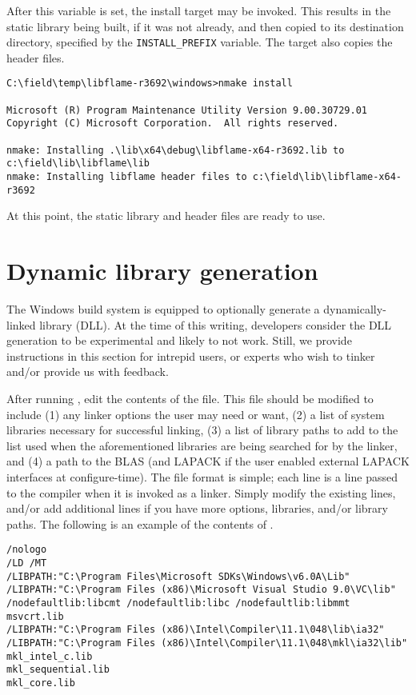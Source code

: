\noindent
After this variable is set, the \nmake install target may be invoked.
This results in the static library being built, if it was not already, and
then copied to its destination directory, specified by the
{\tt INSTALL\_PREFIX} \nmake variable.
The \install target also copies the \libflame header files.

\begin{Verbatim}[frame=single,framesep=2.5mm,xleftmargin=5mm,fontsize=\footnotesize]
C:\field\temp\libflame-r3692\windows>nmake install

Microsoft (R) Program Maintenance Utility Version 9.00.30729.01
Copyright (C) Microsoft Corporation.  All rights reserved.

nmake: Installing .\lib\x64\debug\libflame-x64-r3692.lib to c:\field\lib\libflame\lib
nmake: Installing libflame header files to c:\field\lib\libflame-x64-r3692
\end{Verbatim}

At this point, the static library and header files are ready to use.



\section{Dynamic library generation}
\label{sec:dll}

The Windows build system is equipped to optionally generate a
dynamically-linked library (DLL).
At the time of this writing, \libflame developers consider the DLL generation
to be experimental and likely to not work.
Still, we provide instructions in this section for intrepid users,
or experts who wish to tinker and/or provide us with feedback.

After running \configurecmdns, edit the contents of the \linkargs file.
This file should be modified to include (1) any linker options the user
may need or want, (2) a list of system libraries necessary for
successful linking, (3) a list of library paths to add to the list
used when the aforementioned libraries are being searched for by the linker,
and (4) a path to the BLAS (and LAPACK if the user enabled external
LAPACK interfaces at configure-time).
The file format is simple; each line is a line passed to the compiler when
it is invoked as a linker.
Simply modify the existing lines, and/or add additional lines if you have
more options, libraries, and/or library paths.
The following is an example of the contents of \linkargsns.

\begin{Verbatim}[frame=single,framesep=2.5mm,xleftmargin=5mm,fontsize=\footnotesize]
/nologo
/LD /MT
/LIBPATH:"C:\Program Files\Microsoft SDKs\Windows\v6.0A\Lib"
/LIBPATH:"C:\Program Files (x86)\Microsoft Visual Studio 9.0\VC\lib"
/nodefaultlib:libcmt /nodefaultlib:libc /nodefaultlib:libmmt
msvcrt.lib
/LIBPATH:"C:\Program Files (x86)\Intel\Compiler\11.1\048\lib\ia32"
/LIBPATH:"C:\Program Files (x86)\Intel\Compiler\11.1\048\mkl\ia32\lib"
mkl_intel_c.lib
mkl_sequential.lib
mkl_core.lib
\end{Verbatim}

